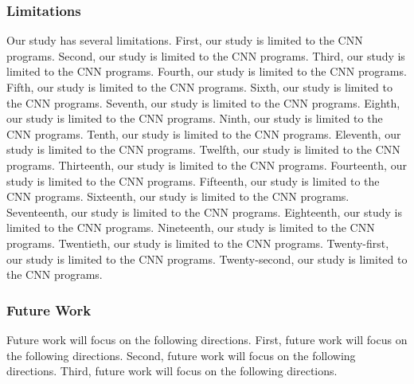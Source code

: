 \label{limitations}

\subsubsection{Limitations}
Our study has several limitations. First, our study is limited to the CNN
programs. Second, our study is limited to the CNN programs. Third, our study is
limited to the CNN programs. Fourth, our study is limited to the CNN programs.
Fifth, our study is limited to the CNN programs. Sixth, our study is limited to
the CNN programs. Seventh, our study is limited to the CNN programs. Eighth, our
study is limited to the CNN programs. Ninth, our study is limited to the CNN
programs. Tenth, our study is limited to the CNN programs. Eleventh, our study
is limited to the CNN programs. Twelfth, our study is limited to the CNN
programs. Thirteenth, our study is limited to the CNN programs. Fourteenth, our
study is limited to the CNN programs. Fifteenth, our study is limited to the CNN
programs. Sixteenth, our study is limited to the CNN programs. Seventeenth, our
study is limited to the CNN programs. Eighteenth, our study is limited to the
CNN programs. Nineteenth, our study is limited to the CNN programs. Twentieth,
our study is limited to the CNN programs. Twenty-first, our study is limited to
the CNN programs. Twenty-second, our study is limited to the CNN programs.

\subsubsection{Future Work}
Future work will focus on the following directions. First, future work will
focus on the following directions. Second, future work will focus on the
following directions. Third, future work will focus on the following
directions.






